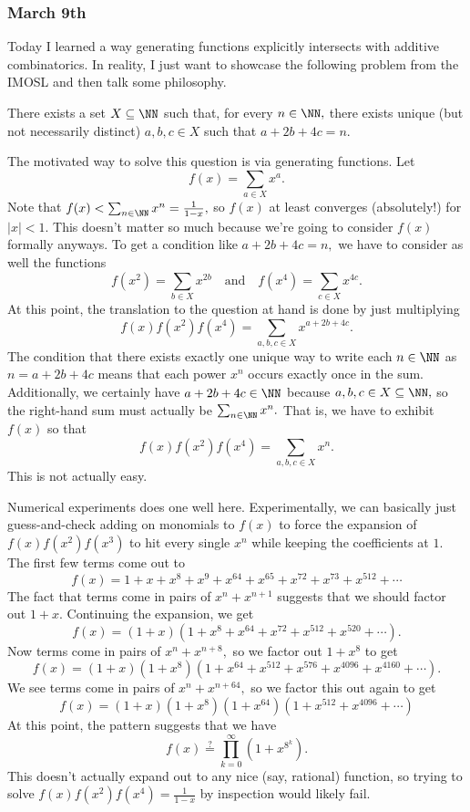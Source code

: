 \subsubsection{March 9th}
Today I learned a way generating functions explicitly intersects with additive combinatorics. In reality, I just want to showcase the following problem from the IMOSL and then talk some philosophy.
\begin{proposition}
    There exists a set $X\subseteq\NN$ such that, for every $n\in\NN,$ there exists unique (but not necessarily distinct) $a,b,c\in X$ such that $a+2b+4c=n.$
\end{proposition}
The motivated way to solve this question is via generating functions. Let
\[f(x)=\sum_{a\in X}x^a.\]
Note that $f(x)<\sum_{n\in\NN}x^n=\frac1{1-x},$ so $f(x)$ at least converges (absolutely!) for $|x|<1.$ This doesn't matter so much because we're going to consider $f(x)$ formally anyways. To get a condition like $a+2b+4c=n,$ we have to consider as well the functions
\[f\left(x^2\right)=\sum_{b\in X}x^{2b}\quad\text{and}\quad f\left(x^4\right)=\sum_{c\in X}x^{4c}.\]
At this point, the translation to the question at hand is done by just multiplying
\[f(x)f\left(x^2\right)f\left(x^4\right)=\sum_{a,b,c\in X}x^{a+2b+4c}.\]
The condition that there exists exactly one unique way to write each $n\in\NN$ as $n=a+2b+4c$ means that each power $x^n$ occurs exactly once in the sum. Additionally, we certainly have $a+2b+4c\in\NN$ because $a,b,c\in X\subseteq\NN,$ so the right-hand sum must actually be $\sum_{n\in\NN}x^n.$ That is, we have to exhibit $f(x)$ so that
\[f(x)f\left(x^2\right)f\left(x^4\right)=\sum_{a,b,c\in X}x^n.\]
This is not actually easy.

Numerical experiments does one well here. Experimentally, we can basically just guess-and-check adding on monomials to $f(x)$ to force the expansion of $f(x)f\left(x^2\right)f\left(x^3\right)$ to hit every single $x^n$ while keeping the coefficients at $1.$ The first few terms come out to
\[f(x)=1+x+x^8+x^9+x^{64}+x^{65}+x^{72}+x^{73}+x^{512}+\cdots\]
The fact that terms come in pairs of $x^n+x^{n+1}$ suggests that we should factor out $1+x.$ Continuing the expansion, we get
\[f(x)=(1+x)\left(1+x^8+x^{64}+x^{72}+x^{512}+x^{520}+\cdots\right).\]
Now terms come in pairs of $x^n+x^{n+8},$ so we factor out $1+x^8$ to get
\[f(x)=(1+x)\left(1+x^8\right)\left(1+x^{64}+x^{512}+x^{576}+x^{4096}+x^{4160}+\cdots\right).\]
We see terms come in pairs of $x^n+x^{n+64},$ so we factor this out again to get
\[f(x)=(1+x)\left(1+x^8\right)\left(1+x^64\right)\left(1+x^{512}+x^{4096}+\cdots\right)\]
At this point, the pattern suggests that we have
\[f(x)\stackrel?=\prod_{k=0}^\infty\left(1+x^{8^k}\right).\]
This doesn't actually expand out to any nice (say, rational) function, so trying to solve $f(x)f\left(x^2\right)f\left(x^4\right)=\frac1{1-x}$ by inspection would likely fail.

